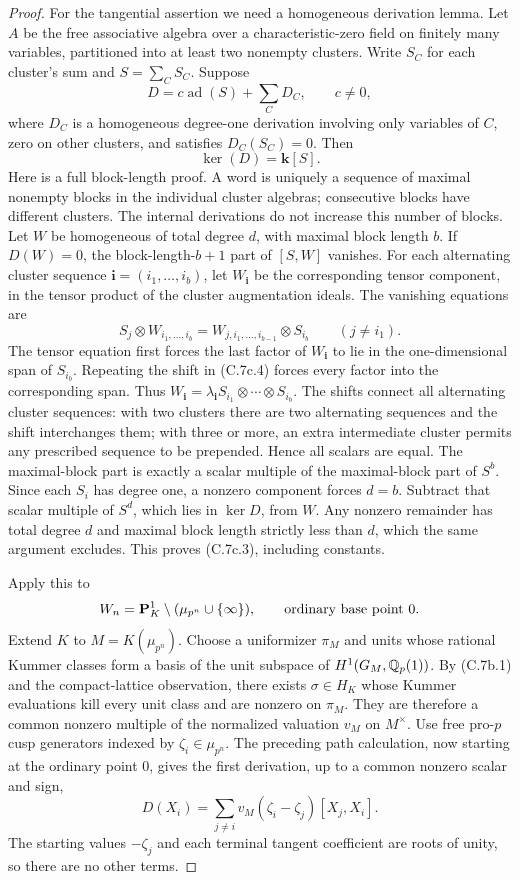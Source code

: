 \begin{proof}
For the tangential assertion we need a homogeneous derivation lemma.
Let $A$ be the free associative algebra over a characteristic-zero field
on finitely many variables, partitioned into at least two nonempty
clusters. Write $S_C$ for each cluster's sum and $S=\sum_C S_C$.
Suppose
\[
 D=c\operatorname{ad}(S)+\sum_C D_C,\qquad c\ne0,              \tag{C.7c.2}
\]
where $D_C$ is a homogeneous degree-one derivation involving only variables
of $C$, zero on other clusters, and satisfies $D_C(S_C)=0$. Then
\[
 \ker(D)=\mathbf k[S].                                        \tag{C.7c.3}
\]
Here is a full block-length proof. A word is uniquely a sequence of
maximal nonempty blocks in the individual cluster algebras; consecutive
blocks have different clusters. The internal derivations do not increase
this number of blocks. Let $W$ be homogeneous of total degree $d$, with
maximal block length $b$. If $D(W)=0$, the block-length-$b+1$ part of
$[S,W]$ vanishes. For each alternating cluster sequence
$\mathbf i=(i_1,\ldots,i_b)$, let $W_{\mathbf i}$ be the corresponding
tensor component, in the tensor product of the cluster augmentation
ideals. The vanishing equations are
\[
 S_j\otimes W_{i_1,\ldots,i_b}
   =W_{j,i_1,\ldots,i_{b-1}}\otimes S_{i_b}
       \qquad(j\ne i_1).                                     \tag{C.7c.4}
\]
The tensor equation first forces the last factor of $W_{\mathbf i}$
to lie in the one-dimensional span of $S_{i_b}$. Repeating the shift in
(C.7c.4) forces every factor into the corresponding span. Thus
$W_{\mathbf i}=\lambda_{\mathbf i}S_{i_1}\otimes\cdots\otimes S_{i_b}$.
The shifts connect all alternating cluster sequences: with two clusters
there are two alternating sequences and the shift interchanges them;
with three or more, an extra intermediate cluster permits any prescribed
sequence to be prepended. Hence all scalars are equal. The maximal-block
part is exactly a scalar multiple of the maximal-block part of $S^b$.
Since each $S_i$ has degree one, a nonzero component forces $d=b$.
Subtract that scalar multiple of $S^d$, which lies in $\ker D$, from $W$.
Any nonzero remainder has total degree $d$ and maximal block length
strictly less than $d$, which the same argument excludes. This proves
(C.7c.3), including constants.

Apply this to
\[
 W_n=\mathbf P^1_K\setminus(\mu_{p^n}\cup\{\infty\}),
       \qquad \hbox{ordinary base point }0.
\]
Extend $K$ to $M=K(\mu_{p^n})$. Choose a uniformizer $\pi_M$ and units
whose rational Kummer classes form a basis of the unit subspace of
$H^1(G_M,\mathbb Q_p(1))$. By (C.7b.1) and the compact-lattice observation,
there exists $\sigma\in H_K$ whose Kummer evaluations kill every unit
class and are nonzero on $\pi_M$. They are therefore a common nonzero
multiple of the normalized valuation $v_M$ on $M^\times$.
Use free pro-$p$ cusp generators indexed by $\zeta_i\in\mu_{p^n}$.
The preceding path calculation, now starting at the ordinary point $0$,
gives the first derivation, up to a common nonzero scalar and sign,
\[
 D(X_i)=\sum_{j\ne i}v_M(\zeta_i-\zeta_j)[X_j,X_i].           \tag{C.7c.5}
\]
The starting values $-\zeta_j$ and each terminal tangent coefficient
are roots of unity, so there are no other terms.


\end{proof}
